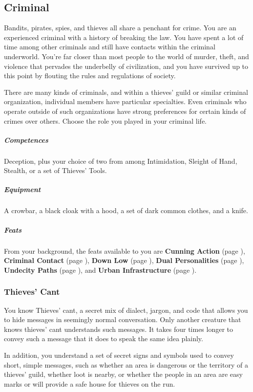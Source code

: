 \subsection*{Criminal} \label{ssec::criminal}
    Bandits, pirates, spies, and thieves all share a penchant for crime.
    You are an experienced criminal with a history of breaking the law.
    You have spent a lot of time among other criminals and still have contacts within the criminal underworld.
    You're far closer than most people to the world of murder, theft, and violence that pervades the underbelly of civilization, and you have survived up to this point by flouting the rules and regulations of society.

    There are many kinds of criminals, and within a thieves' guild or similar criminal organization, individual members have particular specialties.
    Even criminals who operate outside of such organizations have strong preferences for certain kinds of crimes over others.
    Choose the role you played in your criminal life.

    \subparagraph{Competences} Deception, plus your choice of two from among Intimidation, Sleight of Hand, Stealth, or a set of Thieves' Tools.

    \subparagraph{Equipment} A crowbar, a black cloak with a hood, a set of dark common clothes, and a knife.

    \subparagraph{Feats} From your background, the feats available to you are
    \textbf{Cunning Action} (page \pageref{feat::cunningaction}),
    \textbf{Criminal Contact} (page \pageref{feat::criminalcontact}),
    \textbf{Down Low} (page \pageref{feat::downlow}),
    \textbf{Dual Personalities} (page \pageref{feat::dualpersonalities}),
    \textbf{Undecity Paths} (page \pageref{feat::undercitypaths}), and
    \textbf{Urban Infrastructure} (page \pageref{feat::urbaninfrastructure}).

    \subsubsection{Thieves' Cant} \label{feat::thievescant}
        You know Thieves' cant, a secret mix of dialect, jargon, and code that allows you to hide messages in seemingly normal conversation.
        Only another creature that knows thieves' cant understands such messages.
        It takes four times longer to convey such a message that it does to speak the same idea plainly.

        In addition, you understand a set of secret signs and symbols used to convey short, simple messages, such as whether an area is dangerous or the territory of a thieves' guild, whether loot is nearby, or whether the people in an area are easy marks or will provide a safe house for thieves on the run.

